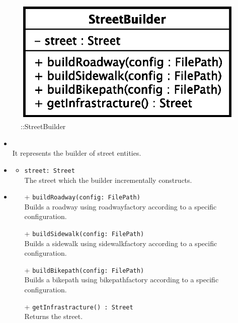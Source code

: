 \begin{figure}[h]
\centering
\includegraphics[scale=0.6,keepaspectratio]{images/solution/app/backend/street_builder.eps}
\caption{\pReactiveBuild::StreetBuilder}
\label{fig:sd-app-street_builder}
\end{figure}
\FloatBarrier
\begin{itemize}
  \item \textbf{\descr} \\
    It represents the builder of street entities.
  \item \textbf{\attrs}
  \begin{itemize}
    \item \texttt{street: Street} \\
The street which the builder incrementally constructs.
  \end{itemize}
  \item \textbf{\ops}
  \begin{itemize} 
    \item[+] \texttt{buildRoadway(config: FilePath)} \\
Builds a roadway using roadwayfactory according to a specific configuration.
    \item[+] \texttt{buildSidewalk(config: FilePath)} \\
Builds a sidewalk using sidewalkfactory according to a specific configuration.
    \item[+] \texttt{buildBikepath(config: FilePath)} \\
Builds a bikepath using bikepathfactory according to a specific configuration.
    \item[+] \texttt{getInfrastracture() : Street} \\
Returns the street.
  \end{itemize}
\end{itemize}

